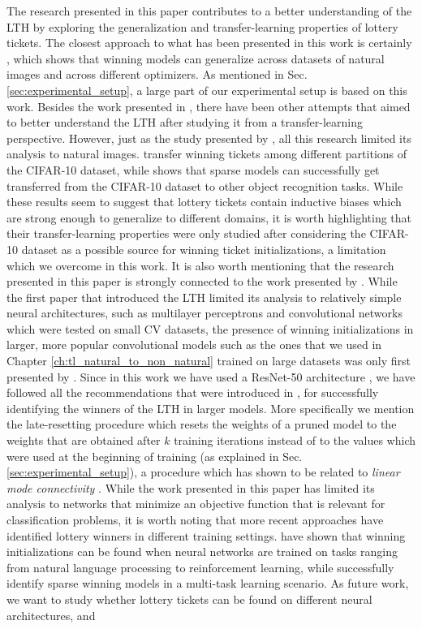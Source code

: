 The research presented in this paper contributes to a better understanding of the LTH by exploring the generalization and transfer-learning properties of lottery tickets. The closest approach to what has been presented in this work is certainly \cite{morcos2019one}, which shows that winning models can generalize across datasets of natural images and across different optimizers. As mentioned in Sec. \ref{sec:experimental_setup}, a large part of our experimental setup is based on this work. Besides the work presented in \cite{morcos2019one}, there have been other attempts that aimed to better understand the LTH after studying it from a transfer-learning perspective. However, just as the study presented by \citet{morcos2019one}, all this research limited its analysis to natural images. \citet{van2019using} transfer winning tickets among different partitions of the CIFAR-10 dataset, while \citet{mehta2019sparse} shows that sparse models can successfully get transferred from the CIFAR-10 dataset to other object recognition tasks. While these results seem to suggest that lottery tickets contain inductive biases which are strong enough to generalize to different domains, it is worth highlighting that their transfer-learning properties were only studied after considering the CIFAR-10 dataset as a possible source for winning ticket initializations, a limitation which we overcome in this work. It is also worth mentioning that the research presented in this paper is strongly connected to the work presented by \citet{franklestabilizing}. While the first paper that introduced the LTH limited its analysis to relatively simple neural architectures, such as multilayer perceptrons and convolutional networks which were tested on small CV datasets, the presence of winning initializations in larger, more popular convolutional models such as the ones that we used in Chapter \ref{ch:tl_natural_to_non_natural} trained on large datasets \cite{russakovsky2015imagenet} was only first presented by \cite{franklestabilizing}. Since in this work we have used a ResNet-50 architecture \cite{he2016deep}, we have followed all the recommendations that were introduced in \cite{franklestabilizing}, for successfully identifying the winners of the LTH in larger models. More specifically we mention the late-resetting procedure which resets the weights of a pruned model to the weights that are obtained after $k$ training iterations instead of to the values which were used at the beginning of training (as explained in Sec. \ref{sec:experimental_setup}), a procedure which has shown to be related to \textit{linear mode connectivity} \cite{frankle2019linear}. While the work presented in this paper has limited its analysis to networks that minimize an objective function that is relevant for classification problems, it is worth noting that more recent approaches have identified lottery winners in different training settings. \citet{yu2019playing} have shown that winning initializations can be found when neural networks are trained on tasks ranging from natural language processing to reinforcement learning, while \citet{sun2019learning} successfully identify sparse winning models in a multi-task learning scenario. As future work, we want to study whether lottery tickets can be found on different neural architectures, and 